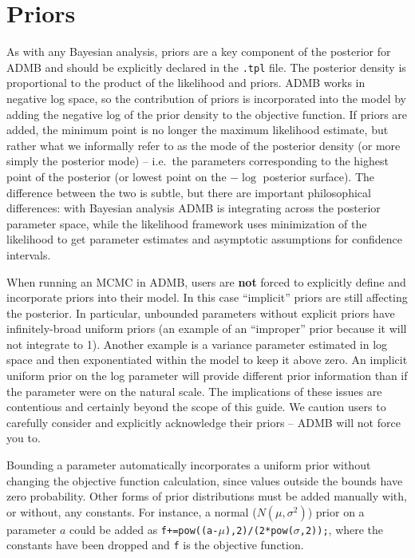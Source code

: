 \documentclass{article}\usepackage[]{graphicx}\usepackage[]{color}
\begin{document}
\section{Priors}
As with any Bayesian analysis, priors are a key component of
the posterior for ADMB and should be explicitly declared in
the \texttt{.tpl} file. The posterior density is
proportional to the product of the likelihood and
priors. ADMB works in negative log space, so the
contribution of priors is incorporated into the model by
adding the negative log of the prior density to the
objective function. If priors are added, the minimum point
is no longer the maximum likelihood estimate, but rather
what we informally refer to as the mode of the posterior
density (or more simply the posterior mode) -- i.e.\ the
parameters corresponding to the highest point of the
posterior (or lowest point on the $-\log$ posterior
surface). The difference between the two is subtle, but
there are important philosophical differences: with Bayesian
analysis ADMB is integrating across the posterior parameter
space, while the likelihood framework uses minimization of
the likelihood to get parameter estimates and asymptotic
assumptions for confidence intervals.

When running an MCMC in ADMB, users are \textbf{not} forced
to explicitly define and incorporate priors into their
model. In this case ``implicit'' priors are still affecting
the posterior. In particular, unbounded parameters without
explicit priors have infinitely-broad uniform priors (an
example of an ``improper'' prior because it will not
integrate to 1). Another example is a variance parameter
estimated in log space and then exponentiated within the
model to keep it above zero. An implicit uniform prior on
the log parameter will provide different prior information
than if the parameter were on the natural scale. The
implications of these issues are contentious and certainly
beyond the scope of this guide. We caution users to
carefully consider and explicitly acknowledge their priors
-- ADMB will not force you to.

Bounding a parameter automatically incorporates a uniform
prior without changing the objective function calculation,
since values outside the bounds have zero probability. Other
forms of prior distributions must be added manually with, or
without, any constants. For instance, a normal
($N(\mu,\sigma^2)$) prior on a parameter $a$ could be added
as \texttt{f+=pow((a-$\mu$),2)/(2*pow($\sigma$,2));}, where the
constants have been dropped and \texttt{f} is the objective
function.
\end{document}
